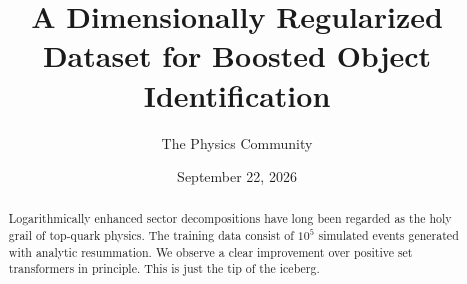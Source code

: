 \documentclass[11pt]{article}
\title{A Dimensionally Regularized Dataset for Boosted Object Identification}
\author{The Physics Community}
\date{September 22, 2026}
\numberwithin{equation}{section}
\theoremstyle{definition}
\theoremstyle{remark}
\begin{document}
\maketitle
\begin{abstract}
Logarithmically enhanced sector decompositions have long been regarded
as the holy grail of top-quark physics. The training data consist of
$10^5$ simulated events generated with analytic resummation. We observe
a clear improvement over positive set transformers in principle. This is
just the tip of the iceberg.
\end{abstract}
\tableofcontents



\nocite{*}


\end{document}
